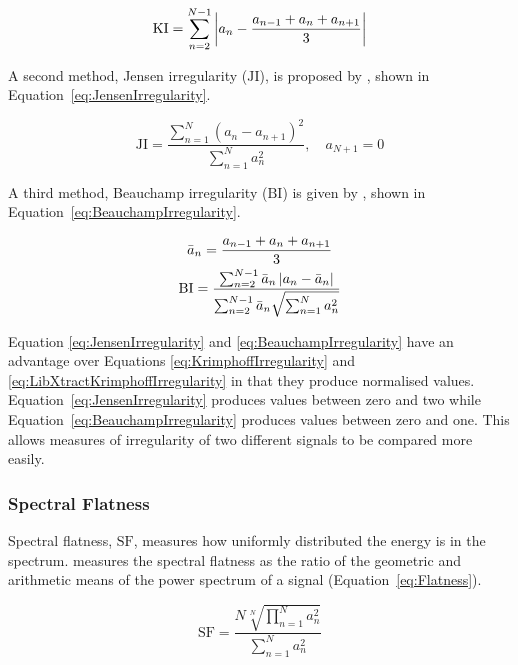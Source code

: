 			\begin{equation}
				\mathrm{KI} = \sum_{n = 2}^{N - 1}
						  \left|a_{n} - \frac{a_{n-1} + a_{n} + a_{n+1}}{3}\right|
				\label{eq:LibXtractKrimphoffIrregularity}
			\end{equation}

			A second method, Jensen irregularity ($\mathrm{JI}$), is proposed by \citet{jensen1999timbre},
			shown in Equation~\ref{eq:JensenIrregularity}.

			\begin{equation}
				\mathrm{JI} = \frac{\sum_{n = 1}^{N} (a_{n} - a_{n+1})^{2}}
						   {\sum_{n = 1}^{N} a_{n}^{2}},
					      \quad a_{N+1} = 0
				\label{eq:JensenIrregularity}
			\end{equation}

			A third method, Beauchamp irregularity ($\mathrm{BI}$) is given by \citet{beauchamp2007analysis},
			shown in Equation~\ref{eq:BeauchampIrregularity}.

			\begin{gather}
			        \bar{a}_{n} = \frac{a_{n-1} + a_{n} + a_{n+1}}{3} \nonumber \\
				\mathrm{BI} = \frac{\sum_{n = 2}^{N - 1} \bar{a}_{n} \left|a_{n} - \bar{a}_{n}\right|}
						   {\sum_{n = 2}^{N - 1} \bar{a}_{n} \sqrt{\sum_{n = 1}^{N} a_{n}^{2}}}
				\label{eq:BeauchampIrregularity}
			\end{gather}

			Equation \ref{eq:JensenIrregularity} and \ref{eq:BeauchampIrregularity} have an advantage over
			Equations \ref{eq:KrimphoffIrregularity} and \ref{eq:LibXtractKrimphoffIrregularity} in that they
			produce normalised values. Equation~\ref{eq:JensenIrregularity} produces values between zero and
			two while Equation~\ref{eq:BeauchampIrregularity} produces values between zero and one. This allows
			measures of irregularity of two different signals to be compared more easily.

		\subsubsection*{Spectral Flatness}
			Spectral flatness, $\mathrm{SF}$, measures how uniformly distributed the energy is in the spectrum.
			\citet{johnston1988transform} measures the spectral flatness as the ratio of the geometric and
			arithmetic means of the power spectrum of a signal (Equation~\ref{eq:Flatness}).

			\begin{equation}
				\mathrm{SF} = \frac{N\sqrt[N]{\prod_{n = 1}^{N} a_{n}^{2}}}
						   {\sum_{n = 1}^{N} a_{n}^{2}}
				\label{eq:Flatness}
			\end{equation}


